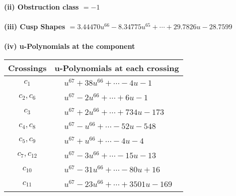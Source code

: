 \documentclass[1p]{elsarticle_modified}
\theoremstyle{definition}
\begin{document}
\flushleft \textbf{(ii) Obstruction class $= -1$}\\~\\
\flushleft \textbf{(iii) Cusp Shapes $= 3.44470 u^{66}-8.34775 u^{65}+\cdots+29.7826 u-28.7599$}\\~\\
\newpage\renewcommand{\arraystretch}{1}
\flushleft \textbf{(iv) u-Polynomials at the component}\newline \\
\begin{tabular}{m{50pt}|m{274pt}}
Crossings & \hspace{64pt}u-Polynomials at each crossing \\
\hline $$\begin{aligned}c_{1}\end{aligned}$$&$\begin{aligned}
&u^{67}+38 u^{66}+\cdots-4 u-1
\end{aligned}$\\
\hline $$\begin{aligned}c_{2},c_{6}\end{aligned}$$&$\begin{aligned}
&u^{67}-2 u^{66}+\cdots+6 u-1
\end{aligned}$\\
\hline $$\begin{aligned}c_{3}\end{aligned}$$&$\begin{aligned}
&u^{67}+2 u^{66}+\cdots+734 u-173
\end{aligned}$\\
\hline $$\begin{aligned}c_{4},c_{8}\end{aligned}$$&$\begin{aligned}
&u^{67}- u^{66}+\cdots-52 u-548
\end{aligned}$\\
\hline $$\begin{aligned}c_{5},c_{9}\end{aligned}$$&$\begin{aligned}
&u^{67}+u^{66}+\cdots-4 u-4
\end{aligned}$\\
\hline $$\begin{aligned}c_{7},c_{12}\end{aligned}$$&$\begin{aligned}
&u^{67}-3 u^{66}+\cdots-15 u-13
\end{aligned}$\\
\hline $$\begin{aligned}c_{10}\end{aligned}$$&$\begin{aligned}
&u^{67}-31 u^{66}+\cdots-80 u+16
\end{aligned}$\\
\hline $$\begin{aligned}c_{11}\end{aligned}$$&$\begin{aligned}
&u^{67}-23 u^{66}+\cdots+3501 u-169
\end{aligned}$\\
\hline
\end{tabular}\\~\\
\end{document}
